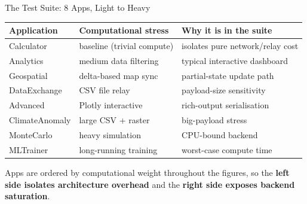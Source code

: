 \documentclass[aspectratio=169]{beamer}
\begin{document}
\begin{frame}{The Test Suite: 8 Apps, Light to Heavy}

\begin{center}
\small
\begin{tabular}{@{}lll@{}}
\toprule
\textbf{Application} & \textbf{Computational stress} & \textbf{Why it is in the suite} \\
\midrule
Calculator      & baseline (trivial compute) & isolates pure network/relay cost \\
Analytics       & medium data filtering       & typical interactive dashboard \\
Geospatial      & delta-based map sync        & partial-state update path \\
DataExchange    & CSV file relay              & payload-size sensitivity \\
Advanced        & Plotly interactive          & rich-output serialisation \\
ClimateAnomaly  & large CSV + raster          & big-payload stress \\
MonteCarlo      & heavy simulation            & CPU-bound backend \\
MLTrainer       & long-running training       & worst-case compute time \\
\bottomrule
\end{tabular}
\end{center}

\vspace{0.6em}
\begin{center}
\small
Apps are ordered by computational weight throughout the figures, so the
\textbf{left side isolates architecture overhead} and the
\textbf{right side exposes backend saturation}.
\end{center}

\end{frame}
\end{document}
